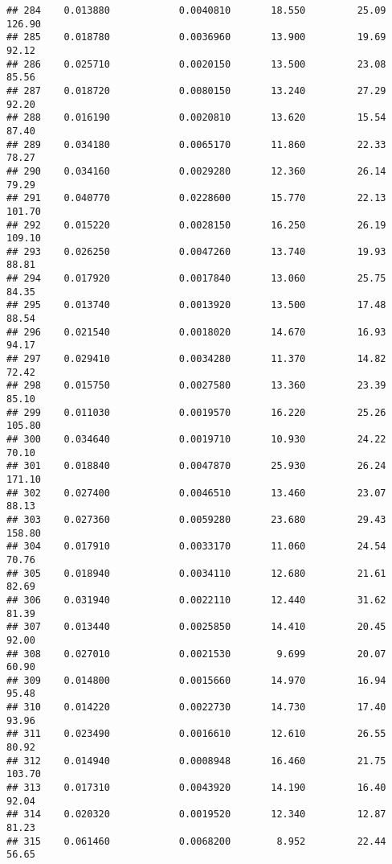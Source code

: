\documentclass[
]{article}
\begin{document}
\begin{verbatim}
## 284    0.013880            0.0040810       18.550         25.09          126.90
## 285    0.018780            0.0036960       13.900         19.69           92.12
## 286    0.025710            0.0020150       13.500         23.08           85.56
## 287    0.018720            0.0080150       13.240         27.29           92.20
## 288    0.016190            0.0020810       13.620         15.54           87.40
## 289    0.034180            0.0065170       11.860         22.33           78.27
## 290    0.034160            0.0029280       12.360         26.14           79.29
## 291    0.040770            0.0228600       15.770         22.13          101.70
## 292    0.015220            0.0028150       16.250         26.19          109.10
## 293    0.026250            0.0047260       13.740         19.93           88.81
## 294    0.017920            0.0017840       13.060         25.75           84.35
## 295    0.013740            0.0013920       13.500         17.48           88.54
## 296    0.021540            0.0018020       14.670         16.93           94.17
## 297    0.029410            0.0034280       11.370         14.82           72.42
## 298    0.015750            0.0027580       13.360         23.39           85.10
## 299    0.011030            0.0019570       16.220         25.26          105.80
## 300    0.034640            0.0019710       10.930         24.22           70.10
## 301    0.018840            0.0047870       25.930         26.24          171.10
## 302    0.027400            0.0046510       13.460         23.07           88.13
## 303    0.027360            0.0059280       23.680         29.43          158.80
## 304    0.017910            0.0033170       11.060         24.54           70.76
## 305    0.018940            0.0034110       12.680         21.61           82.69
## 306    0.031940            0.0022110       12.440         31.62           81.39
## 307    0.013440            0.0025850       14.410         20.45           92.00
## 308    0.027010            0.0021530        9.699         20.07           60.90
## 309    0.014800            0.0015660       14.970         16.94           95.48
## 310    0.014220            0.0022730       14.730         17.40           93.96
## 311    0.023490            0.0016610       12.610         26.55           80.92
## 312    0.014940            0.0008948       16.460         21.75          103.70
## 313    0.017310            0.0043920       14.190         16.40           92.04
## 314    0.020320            0.0019520       12.340         12.87           81.23
## 315    0.061460            0.0068200        8.952         22.44           56.65

\end{verbatim}
\end{document}
